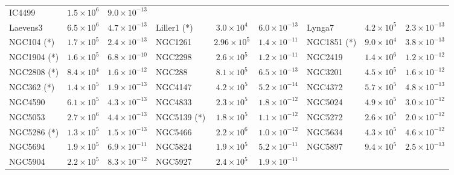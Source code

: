 \begin{table}
\begin{center}
\begin{tabular}{l | c | c | l |  c|   c | l | c | c }
                IC4499 &  $1.5\times10^6$ &          $9.0\times10^{-13}$  \\
            Laevens3 &  $6.5\times10^6$ &          $4.7\times10^{-13}$  &
            Liller1 (*) &  $3.0\times10^4$ &          $6.0\times10^{-13}$  &
                Lynga7 &  $4.2\times10^5$ &         $ 2.3\times10^{-13}$  \\
                NGC104 (*) &  $1.7\times10^5$ &         $ 2.4\times10^{-13}$  &
            NGC1261 &  $2.96\times10^5$ &        $  1.4\times10^{-11}$  &
            NGC1851 (*) &  $9.0\times10^4$ &          $3.8\times10^{-13}$  \\
            NGC1904 (*) &  $1.6\times10^5$ &          $6.8\times10^{-10}$  &
            NGC2298 &  $2.6\times10^5$ &          $1.2\times10^{-11}$  &
            NGC2419 &  $1.4\times10^6$ &          $1.2\times10^{-12}$  \\
            NGC2808 (*) &  $8.4\times10^4$ &          $1.6\times10^{-12}$  &
                NGC288 &  $8.1\times10^5$ &          $6.5\times10^{-13}$  &
            NGC3201 &  $4.5\times10^5$ &         $ 1.6\times10^{-12}$ \\
                NGC362 (*) &  $1.4\times10^5$ &          $1.9\times10^{-13}$  &
            NGC4147 &  $4.2\times10^5$ &         $ 5.2\times10^{-14}$ &
            NGC4372 &  $5.7\times10^5$ &          $4.8\times10^{-13}$ \\
            NGC4590 &  $6.1\times10^5$ &          $4.3\times10^{-13}$ &
            NGC4833 &  $2.3\times10^5$ &          $1.8\times10^{-12}$  &
            NGC5024 &  $4.9\times10^5$ &          $3.0\times10^{-12}$  \\
            NGC5053 &  $2.7\times10^6$ &          $4.4\times10^{-13}$  &
            NGC5139 (*) &  $1.8\times10^5$ &          $1.1\times10^{-12}$ &
            NGC5272 &  $2.6\times10^5$ &          $2.0\times10^{-12}$  \\
            NGC5286 (*) &  $1.3\times10^5$ &          $1.5\times10^{-13}$ &
            NGC5466 &  $2.2\times10^6$ &          $1.0\times10^{-12}$  &
            NGC5634 &  $4.3\times10^5$ &          $4.6\times10^{-12}$  \\
            NGC5694 &  $1.9\times10^5$ &          $6.9\times10^{-11}$  &
            NGC5824 &  $1.9\times10^5$ &          $5.2\times10^{-11}$  &
            NGC5897 &  $9.4\times10^5$ &          $2.5\times10^{-13}$ \\
            NGC5904 &  $2.2\times10^5$ &          $8.3\times10^{-12}$  &
            NGC5927 &  $2.4\times10^5$ &          $1.9\times10^{-11}$  &

\end{tabular}
\end{center}
\end{table}
